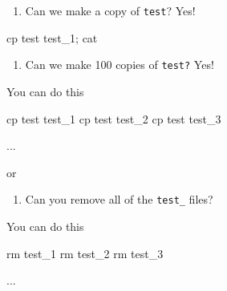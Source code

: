 \documentclass[
  letterpaper,
  DIV=11,
  numbers=noendperiod]{scrreprt}
\newenvironment{Shaded}{\begin{snugshade}}{\end{snugshade}}
\newcommand{\ControlFlowTok}[1]{\textcolor[rgb]{0.00,0.23,0.31}{#1}}
\newcommand{\DataTypeTok}[1]{\textcolor[rgb]{0.68,0.00,0.00}{#1}}
\newcommand{\DecValTok}[1]{\textcolor[rgb]{0.68,0.00,0.00}{#1}}
\newcommand{\ExtensionTok}[1]{\textcolor[rgb]{0.00,0.23,0.31}{#1}}
\newcommand{\FunctionTok}[1]{\textcolor[rgb]{0.28,0.35,0.67}{#1}}
\newcommand{\KeywordTok}[1]{\textcolor[rgb]{0.00,0.23,0.31}{#1}}
\newcommand{\NormalTok}[1]{\textcolor[rgb]{0.00,0.23,0.31}{#1}}
\newcommand{\StringTok}[1]{\textcolor[rgb]{0.13,0.47,0.30}{#1}}
\newcommand{\VariableTok}[1]{\textcolor[rgb]{0.07,0.07,0.07}{#1}}
\providecommand{\tightlist}{%
  \setlength{\itemsep}{0pt}\setlength{\parskip}{0pt}}\usepackage{longtable,booktabs,array}
\begin{document}
\begin{enumerate}
\def\labelenumi{\arabic{enumi}.}
\tightlist
\item
  Can we make a copy of \texttt{test}? Yes!
\end{enumerate}

\begin{Shaded}
\begin{Highlighting}[]

\FunctionTok{cp}\NormalTok{ test test\_1}\KeywordTok{;} \FunctionTok{cat} 
\end{Highlighting}
\end{Shaded}

\begin{enumerate}
\def\labelenumi{\arabic{enumi}.}
\setcounter{enumi}{1}
\tightlist
\item
  Can we make 100 copies of \texttt{test?} Yes!
\end{enumerate}

You can do this

\begin{Shaded}
\begin{Highlighting}[]

\FunctionTok{cp}\NormalTok{ test test\_1 }
\FunctionTok{cp}\NormalTok{ test test\_2}
\FunctionTok{cp}\NormalTok{ test test\_3 }

\ExtensionTok{...} 
\end{Highlighting}
\end{Shaded}

or

\begin{Shaded}
\end{Shaded}

\begin{enumerate}
\def\labelenumi{\arabic{enumi}.}
\setcounter{enumi}{2}
\tightlist
\item
  Can you remove all of the \texttt{test\_} files?
\end{enumerate}

You can do this

\begin{Shaded}
\begin{Highlighting}[]
\FunctionTok{rm}\NormalTok{ test\_1}
\FunctionTok{rm}\NormalTok{ test\_2}
\FunctionTok{rm}\NormalTok{ test\_3 }

\ExtensionTok{...}
\end{Highlighting}
\end{Shaded}
\end{document}
